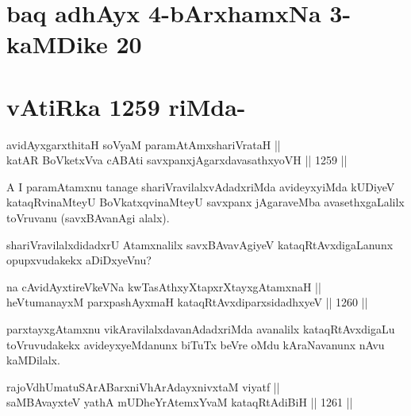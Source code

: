 \section*{baq adhAyx 4-bArxhamxNa 3- kaMDike 20}

\section*{vAtiRka 1259 riMda-}


\begin{shl}
avidAyxgarxthitaH soV\s yaM paramAtAmx\s shariVrataH || \\
katAR BoVketxVva cA\s \s BAti savxpanxjAgarxdavasathxyoVH \hfill || 1259 ||  
\end{shl}

\begin{artha}
A I paramAtamxnu tanage shariVravilalxvAdadxriMda avideyxyiMda kUDiyeV kataqRvinaMteyU BoVkatxqvinaMteyU savxpanx jAgaraveMba avasethxgaLalilx toVruvanu (savxBAvanAgi alalx).
\end{artha}

\begin{artha}
shariVravilalxdidadxrU Atamxnalilx savxBAvavAgiyeV kataqRtAvxdigaLanunx opupxvudakekx aDiDxyeVnu?
\end{artha}

\begin{shl}
na cAvidAyxtireVkeVNa kwTasAthxyXtapxrXtayxgAtamxnaH || \\
heVtumanayxM parxpashAyxmaH kataqRtAvxdiparxsidadhxyeV \hfill || 1260 ||  
\end{shl}

\begin{artha}
parxtayxgAtamxnu vikAravilalxdavanAdadxriMda avanalilx kataqRtAvxdigaLu toVruvudakekx avideyxyeMdanunx biTuTx beVre oMdu kAraNavanunx nAvu kaMDilalx.
\end{artha}


\begin{shl}
rajoVdhUmatuSArABarx\footnotemark[1]niVhArAdayxnivxtaM viyatf || \\
saMBAvayxteV yathA mUDheYrAtemxYvaM kataqRtAdiBiH \hfill || 1261 ||  
\end{shl}	

